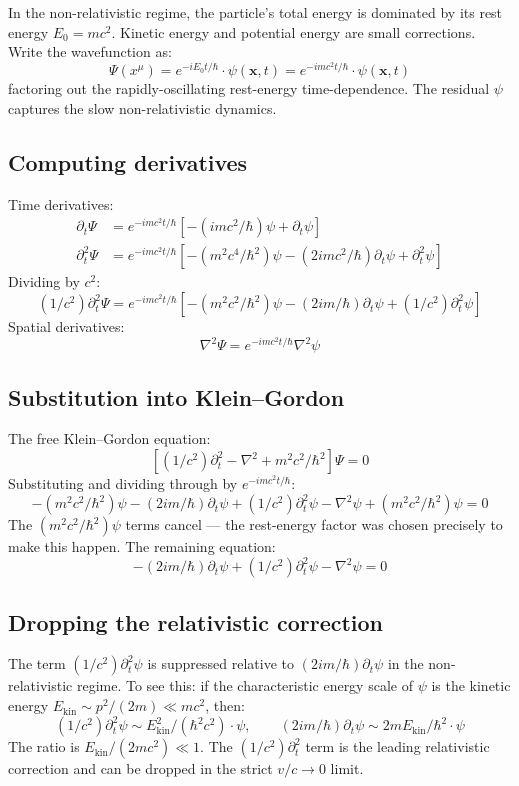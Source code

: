 \documentclass[11pt,a4paper]{article}
\begin{document}
In the non-relativistic regime, the particle's total energy is dominated by its rest energy $E_0 = mc^2$. Kinetic energy and potential energy are small corrections. Write the wavefunction as:
\[
\Psi(x^\mu) = e^{-iE_0 t/\hbar}\cdot\psi(\mathbf{x}, t) = e^{-imc^{2}t/\hbar}\cdot\psi(\mathbf{x}, t)
\]
factoring out the rapidly-oscillating rest-energy time-dependence. The residual $\psi$ captures the slow non-relativistic dynamics.

\subsection{Computing derivatives}

Time derivatives:
\begin{align*}
\partial_t\Psi &= e^{-imc^{2}t/\hbar}[-(imc^{2}/\hbar)\psi + \partial_t\psi] \\
\partial_t^{2}\Psi &= e^{-imc^{2}t/\hbar}[-(m^{2}c^{4}/\hbar^{2})\psi - (2imc^{2}/\hbar)\partial_t\psi + \partial_t^{2}\psi]
\end{align*}
Dividing by $c^2$:
\[
(1/c^{2})\partial_t^{2}\Psi = e^{-imc^{2}t/\hbar}[-(m^{2}c^{2}/\hbar^{2})\psi - (2im/\hbar)\partial_t\psi + (1/c^{2})\partial_t^{2}\psi]
\]
Spatial derivatives:
\[
\nabla^{2}\Psi = e^{-imc^{2}t/\hbar}\nabla^{2}\psi
\]

\subsection{Substitution into Klein--Gordon}

The free Klein--Gordon equation:
\[
[(1/c^{2})\partial_t^{2} - \nabla^{2} + m^{2}c^{2}/\hbar^{2}]\Psi = 0
\]
Substituting and dividing through by $e^{-imc^2t/\hbar}$:
\[
-(m^{2}c^{2}/\hbar^{2})\psi - (2im/\hbar)\partial_t\psi + (1/c^{2})\partial_t^{2}\psi - \nabla^{2}\psi + (m^{2}c^{2}/\hbar^{2})\psi = 0
\]
The $(m^2c^2/\hbar^2)\psi$ terms cancel --- the rest-energy factor was chosen precisely to make this happen. The remaining equation:
\[
-(2im/\hbar)\partial_t\psi + (1/c^{2})\partial_t^{2}\psi - \nabla^{2}\psi = 0
\]

\subsection{Dropping the relativistic correction}

The term $(1/c^2)\partial_t^2\psi$ is suppressed relative to $(2im/\hbar)\partial_t\psi$ in the non-relativistic regime. To see this: if the characteristic energy scale of $\psi$ is the kinetic energy $E_{\mathrm{kin}} \sim p^2/(2m) \ll mc^2$, then:
\[
(1/c^{2})\partial_t^{2}\psi \sim E_{\mathrm{kin}}^{2}/(\hbar^{2}c^{2})\cdot\psi, \qquad (2im/\hbar)\partial_t\psi \sim 2mE_{\mathrm{kin}}/\hbar^{2}\cdot\psi
\]
The ratio is $E_{\mathrm{kin}}/(2mc^2) \ll 1$. The $(1/c^2)\partial_t^2$ term is the leading relativistic correction and can be dropped in the strict $v/c \to 0$ limit.
\end{document}
